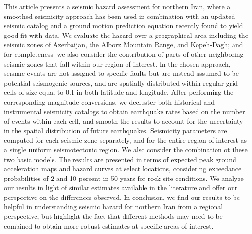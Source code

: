 % 
This article presents a seismic hazard assessment for northern Iran, where a smoothed seismicity approach has been used in combination with an updated seismic catalog and a ground motion prediction equation recently found to yield good fit with data. We evaluate the hazard over a geographical area including the seismic zones of Azerbaijan, the Alborz Mountain Range, and Kopeh-Dagh; and for completeness, we also consider the contribution of parts of other neighboring seismic zones that fall within our region of interest. In the chosen approach, seismic events are not assigned to specific faults but are instead assumed to be potential seismogenic sources, and are spatially distributed within regular grid cells of size equal to 0.1\textdegree{} in both latitude and longitude. After performing the corresponding magnitude conversions, we decluster both historical and instrumental seismicity catalogs to obtain earthquake rates based on the number of events within each cell, and smooth the results to account for the uncertainty in the spatial distribution of future earthquakes. Seismicity parameters are computed for each seismic zone separately, and for the entire region of interest as a single uniform seismotectonic region. We also consider the combination ot these two basic models. The results are presented in terms of expected peak ground acceleration maps and hazard curves at select locations, considering exceedance probabilities of 2 and 10 percent in 50 years for rock site conditions. We analyze our results in light of similar estimates available in the literature and offer our perspective on the differences observed. In conclusion, we find our results to be helpful in understanding seismic hazard for northern Iran from a regional perspective, but highlight the fact that different methods may need to be combined to obtain more robust estimates at specific areas of interest.

